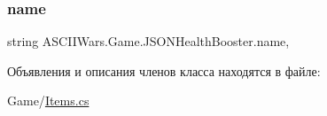 \subsubsection{\texorpdfstring{name}{name}}
{\footnotesize\ttfamily string A\+S\+C\+I\+I\+Wars.\+Game.\+J\+S\+O\+N\+Health\+Booster.\+name\hspace{0.3cm}{\ttfamily [get]}, {\ttfamily [set]}}



Объявления и описания членов класса находятся в файле\+:\begin{DoxyCompactItemize}
\item 
Game/\hyperlink{_items_8cs}{Items.\+cs}\end{DoxyCompactItemize}
